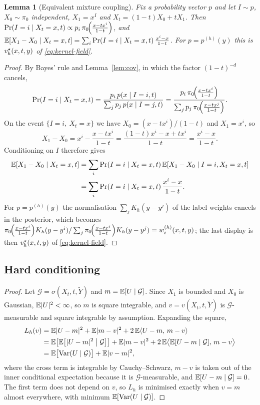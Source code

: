 \documentclass{article} %
\makeatletter
\newif\ificlr
\newcommand{\placeblock}[1]{\ificlr\@nameuse{moved@#1}\fi}
\theoremstyle{plain}
\newtheorem{lemma}[theorem]{Lemma}
\theoremstyle{definition}
\theoremstyle{remark}
\makeatother
\begin{document}
\begin{lemma}[Equivalent mixture coupling]
\label{lem:mixture-coupling}
Fix a probability vector $p$ and let $I\sim p$, $X_0\sim\pi_0$ independent, $X_1=x^I$ and
$X_t=(1-t)X_0+tX_1$. Then $\Pr(I=i\mid X_t=x,t)\propto p_i\,\pi_0\!\Big(\frac{x-tx^{i}}{1-t}\Big)$, and
$\mathbb{E}[X_1-X_0\mid X_t=x,t]=\sum_i\Pr(I=i\mid X_t=x,t)\,\frac{x^i-x}{1-t}$. For
$p=p^{(h)}(y)$ this is $v_h^\star(x,t,y)$ of \eqref{eq:kernel-field}.
\end{lemma}
\begin{proof}
By Bayes' rule and Lemma~\ref{lem:cov}, in which the factor $(1-t)^{-d}$ cancels,
\[
\Pr(I=i\mid X_t=x,t)=\frac{p_i\,p(x\mid I=i,t)}{\sum_jp_j\,p(x\mid I=j,t)}
=\frac{p_i\,\pi_0\!\Big(\frac{x-tx^{i}}{1-t}\Big)}{\sum_jp_j\,\pi_0\!\Big(\frac{x-tx^{j}}{1-t}\Big)} .
\]
On the event $\{I=i,\ X_t=x\}$ we have $X_0=(x-tx^i)/(1-t)$ and $X_1=x^i$, so
\[
X_1-X_0=x^i-\frac{x-tx^i}{1-t}=\frac{(1-t)x^i-x+tx^i}{1-t}=\frac{x^i-x}{1-t}.
\]
Conditioning on $I$ therefore gives
\begin{align*}
\mathbb{E}[X_1-X_0\mid X_t=x,t]
&=\sum_i\Pr(I=i\mid X_t=x,t)\,\mathbb{E}[X_1-X_0\mid I=i,X_t=x,t]\\
&=\sum_i\Pr(I=i\mid X_t=x,t)\,\frac{x^i-x}{1-t}.
\end{align*}
For $p=p^{(h)}(y)$ the normalisation $\sum_jK_h(y-y^j)$ of the label weights cancels in the
posterior, which becomes $\pi_0\!\Big(\frac{x-tx^{i}}{1-t}\Big)K_h(y-y^{i})/\sum_j\pi_0\!\Big(\frac{x-tx^{j}}{1-t}\Big)K_h(y-y^{j})=w_i^{(h)}(x,t,y)$; the last display is
then $v_h^\star(x,t,y)$ of \eqref{eq:kernel-field}.
\end{proof}

\subsection{Hard conditioning}
\label{apx:pf-hard}

\label{apx:pf-projection}
\propprojection*
\begin{proof}
Let $\mathcal G=\sigma(X_t,t,\widetilde Y)$ and $m=\mathbb{E}[U\mid\mathcal G]$. Since $X_1$ is bounded and
$X_0$ is Gaussian, $\mathbb{E}|U|^2<\infty$, so $m$ is square integrable, and $v=v(X_t,t,\widetilde Y)$ is
$\mathcal G$-measurable and square integrable by assumption. Expanding the square,
\begin{align*}
L_h(v)
&=\mathbb{E}|U-m|^2+\mathbb{E}|m-v|^2+2\,\mathbb{E}\langle U-m,\,m-v\rangle\\
&=\mathbb{E}\bigl[\mathbb{E}\bigl[|U-m|^2\bigm|\mathcal G\bigr]\bigr]+\mathbb{E}|m-v|^2
+2\,\mathbb{E}\bigl\langle\mathbb{E}[U-m\mid\mathcal G],\,m-v\bigr\rangle\\
&=\mathbb{E}\bigl[\operatorname{Var}(U\mid\mathcal G)\bigr]+\mathbb{E}|v-m|^2 ,
\end{align*}
where the cross term is integrable by Cauchy--Schwarz, $m-v$ is taken out of the inner conditional
expectation because it is $\mathcal G$-measurable, and $\mathbb{E}[U-m\mid\mathcal G]=0$. The first term
does not depend on $v$, so $L_h$ is minimised exactly when $v=m$ almost everywhere, with minimum
$\mathbb{E}[\operatorname{Var}(U\mid\mathcal G)]$.
\end{proof}
\placeblock{versionconvention}
\end{document}
